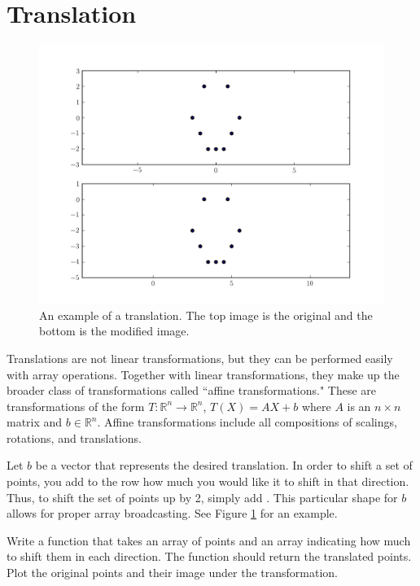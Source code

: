 \section*{Translation}

\begin{figure}
\centering
\includegraphics[width=\textwidth]{shift.pdf}
\caption{
An example of a translation.
The top image is the original and the bottom is the modified image.}
\label{basis:translation}
\end{figure}

Translations are not linear transformations, but they can be performed easily with array operations.
Together with linear transformations, they make up the broader class of transformations called
``affine transformations."
These are transformations of the form $T: \mathbb{R}^n \to \mathbb{R}^n$, $T(X) = AX + b$ where $A$ is
an $n\times n$ matrix and $b \in \mathbb{R}^n$.
Affine transformations include all compositions of scalings, rotations, and translations.


Let $b$ be a vector that represents the desired translation.
In order to shift a set of points, you add to the row how much you would like it to shift
in that direction. Thus, to shift the set of points up by 2, simply add .
This particular shape for $b$ allows for proper array broadcasting.
See Figure \ref{basis:translation} for an example.

\begin{problem}
Write a function that takes an array of points and an array indicating how much to shift
them in each direction. The function should return the translated points.
Plot the original points and their image under the transformation.
\end{problem}

